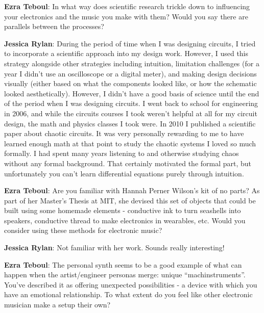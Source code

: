 \textbf{Ezra Teboul}: In what way does scientific research trickle down to influencing your electronics and the music you make with them? Would you say there are parallels between the processes? 
            
\textbf{Jessica Rylan}: During the period of time when I was designing circuits, I tried to incorporate a scientific approach into my design work. However, I used this strategy alongside other strategies including intuition, limitation challenges (for a year I didn't use an oscilloscope or a digital meter), and making design decisions visually (either based on what the components looked like, or how the schematic looked aesthetically). However, I didn't have a good basis of science until the end of the period when I was designing circuits. I went back to school for engineering in 2006, and while the circuits courses I took weren't helpful at all for my circuit design, the math and physics classes I took were. In 2010 I published a scientific paper about chaotic circuits. It was very personally rewarding to me to have learned enough math at that point to study the chaotic systems I loved so much formally. I had spent many years listening to and otherwise studying chaos without any formal background. That certainly motivated the formal part, but unfortunately you can't learn differential equations purely through intuition.

\textbf{Ezra Teboul}: Are you familiar with Hannah Perner Wilson’s kit of no parts? As part of her Master’s Thesis at MIT, she devised this set of objects that could be built using some homemade elements - conductive ink to turn seashells into speakers, conductive thread to make electronics in wearables, etc. Would you consider using these methods for electronic music?
 
\textbf{Jessica Rylan}: Not familiar with her work. Sounds really interesting! 
 
\textbf{Ezra Teboul}: The personal synth seems to be a good example of what can happen when the artist/engineer personas merge: unique ``machinstruments''. You've described it as offering unexpected possibilities - a device with which you have an emotional relationship. To what extent do you feel like other electronic musician make a setup their own? 
             
